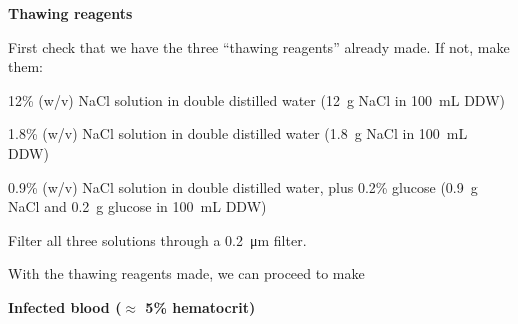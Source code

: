 \documentclass{article}
\begin{document}
\textbf{Thawing reagents}

First check that we have the three ``thawing reagents'' already made. If not, make them:

\begin{description}
	\item[Thaw 1 - ] 12\% (w/v) NaCl solution in double distilled water (\SI{12}{g} NaCl in \SI{100}{mL} DDW)
	\item[Thaw 2 - ] 1.8\% (w/v) NaCl solution in double distilled water (\SI{1.8}{g} NaCl in \SI{100}{mL} DDW)
	\item[Thaw 3 - ] 0.9\% (w/v) NaCl solution in double distilled water, plus 0.2\% glucose (\SI{0.9}{g} NaCl and \SI{0.2}{g} glucose in \SI{100}{mL} DDW)
	\item Filter all three solutions through a \SI{0.2}{\micro\meter} filter.\\
\end{description}

With the thawing reagents made, we can proceed to make

\textbf{Infected blood ($\approx$ 5\% hematocrit)}
\end{document}
